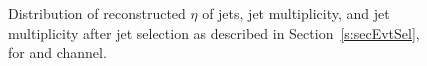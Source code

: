 \begin{figure}
    \caption{Distribution of reconstructed $\eta$ of jets, jet multiplicity, and 
        \PQb jet multiplicity after \PQb jet selection as described in 
        Section~\ref{s:secEvtSel}, for \mujets and \ejets channel.}
    \label{fig:btagPlot2}
\end{figure}

